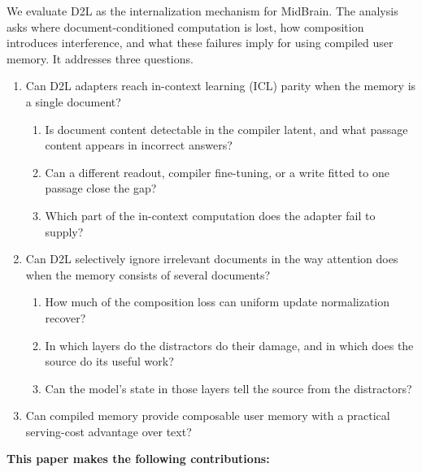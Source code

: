 \documentclass{article}
\begin{document}
We evaluate D2L as the internalization mechanism for MidBrain. The analysis
asks where document-conditioned computation is lost, how composition introduces
interference, and what these failures imply for using compiled user memory.
It addresses three questions.
\begin{enumerate}[label=\textbf{RQ\arabic*},leftmargin=*,nosep]
\item Can D2L adapters reach in-context
learning (ICL) parity when the memory is a single document?
\begin{enumerate}[label=\textbf{RQ1.\arabic*},leftmargin=*,nosep]
\item Is document content detectable in the compiler latent, and what passage
content appears in incorrect answers?
\item Can a different readout, compiler fine-tuning, or a write fitted to one passage
close the gap?
\item Which part of the in-context computation does the adapter fail to supply?
\end{enumerate}
\item Can D2L selectively ignore irrelevant documents in the way attention does
when the memory consists of several documents?
\begin{enumerate}[label=\textbf{RQ2.\arabic*},leftmargin=*,nosep]
\item How much of the composition loss can uniform update normalization recover?
\item In which layers do the distractors do their damage, and in which does the source
do its useful work?
\item Can the model's state in those layers tell the source from the distractors?
\end{enumerate}
\item Can compiled memory provide composable user memory with a practical
serving-cost advantage over text?
\end{enumerate}

\textbf{This paper makes the following contributions:}
\end{document}
